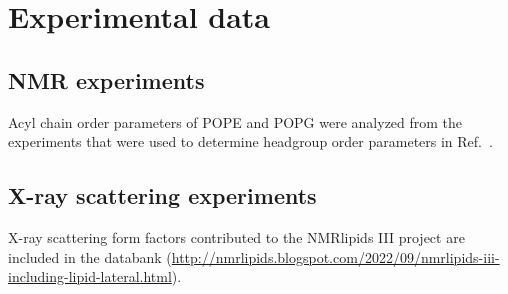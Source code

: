 \documentclass[fleqn,10pt]{wlscirep}
\begin{document}
\pagebreak
\section{Experimental data}
\subsection{NMR experiments}
Acyl chain order parameters of POPE and POPG were analyzed from the experiments that were used to determine headgroup order parameters in Ref.~.

\subsection{X-ray scattering experiments}
X-ray scattering form factors contributed to the NMRlipids III project are included in the databank (\url{http://nmrlipids.blogspot.com/2022/09/nmrlipids-iii-including-lipid-lateral.html}).










\end{document}
